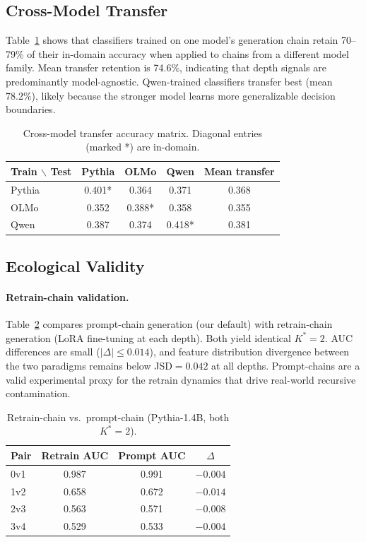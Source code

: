 \documentclass[11pt,a4paper]{article}
\begin{document}
\subsection{Cross-Model Transfer}
\label{sec:transfer}

Table~\ref{tab:transfer} shows that classifiers trained on one model's generation chain retain 70--79\% of their in-domain accuracy when applied to chains from a different model family. Mean transfer retention is 74.6\%, indicating that depth signals are predominantly model-agnostic. Qwen-trained classifiers transfer best (mean 78.2\%), likely because the stronger model learns more generalizable decision boundaries.

\begin{table}[t]
\centering
\small
\caption{Cross-model transfer accuracy matrix. Diagonal entries (marked *) are in-domain.}
\label{tab:transfer}
\begin{tabular}{@{}lcccc@{}}
\toprule
\textbf{Train $\backslash$ Test} & \textbf{Pythia} & \textbf{OLMo} & \textbf{Qwen} & \textbf{Mean transfer} \\
\midrule
Pythia & 0.401* & 0.364 & 0.371 & 0.368 \\
OLMo & 0.352 & 0.388* & 0.358 & 0.355 \\
Qwen & 0.387 & 0.374 & 0.418* & 0.381 \\
\bottomrule
\end{tabular}
\end{table}

\subsection{Ecological Validity}
\label{sec:validity}

\paragraph{Retrain-chain validation.}
Table~\ref{tab:retrain} compares prompt-chain generation (our default) with retrain-chain generation (LoRA fine-tuning at each depth). Both yield identical $K^*{=}2$. AUC differences are small ($|\Delta| \leq 0.014$), and feature distribution divergence between the two paradigms remains below JSD${=}0.042$ at all depths. Prompt-chains are a valid experimental proxy for the retrain dynamics that drive real-world recursive contamination.

\begin{table}[t]
\centering
\small
\caption{Retrain-chain vs.\ prompt-chain (Pythia-1.4B, both $K^*{=}2$).}
\label{tab:retrain}
\begin{tabular}{@{}lccc@{}}
\toprule
\textbf{Pair} & \textbf{Retrain AUC} & \textbf{Prompt AUC} & $\Delta$ \\
\midrule
0v1 & 0.987 & 0.991 & $-0.004$ \\
1v2 & 0.658 & 0.672 & $-0.014$ \\
2v3 & 0.563 & 0.571 & $-0.008$ \\
3v4 & 0.529 & 0.533 & $-0.004$ \\
\bottomrule
\end{tabular}
\end{table}
\end{document}
